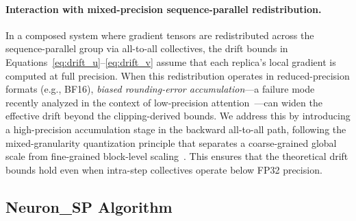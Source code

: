 \documentclass{article}
\begin{document}
\paragraph{Interaction with mixed-precision sequence-parallel redistribution.}
In a composed system where gradient tensors are redistributed across the
sequence-parallel group via all-to-all collectives, the drift bounds in
Equations~\ref{eq:drift_u}--\ref{eq:drift_v} assume that each replica's
local gradient is computed at full precision. When this redistribution
operates in reduced-precision formats (e.g., BF16), \emph{biased rounding-error
accumulation}---a failure mode recently analyzed in the context of
low-precision attention~\citep{lowprec2026iclr}---can widen the effective
drift beyond the clipping-derived bounds. We address this by introducing a
high-precision accumulation stage in the backward all-to-all path,
following the mixed-granularity quantization principle that separates a
coarse-grained global scale from fine-grained block-level
scaling~\citep{moss2026iclr}. This ensures that the theoretical drift
bounds hold even when intra-step collectives operate below FP32 precision.

\subsection{Neuron\_SP Algorithm}
\label{sec:desloc_algorithm}
\end{document}
